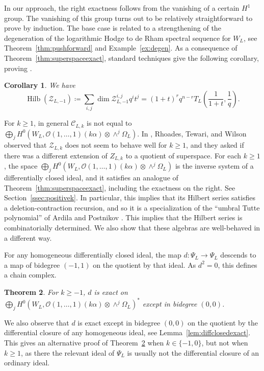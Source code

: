 \documentclass{amsart}
\newtheorem{theorem}{Theorem}[section]
\newtheorem{corollary}[theorem]{Corollary}
\theoremstyle{definition}
\begin{document}
In our approach, the right exactness follows from the vanishing of a certain $H^1$ group. The vanishing of this group turns out to be relatively straightforward to prove by induction. The base case is related to a strengthening of the degeneration of the logarithmic Hodge to de Rham spectral sequence for $W_L$, see Theorem~\ref{thm:pushforward} and Example~\ref{ex:degen}. As a consequence of Theorem~\ref{thm:superspaceexact}, standard techniques give the following corollary, proving \cite[Conjecture 6.1]{Superspace}. 

\begin{corollary}\label{cor:hilbert}
We have
$$\operatorname{Hilb}(\mathcal{Z}_{L, -1}) \coloneqq \sum_{i, j} \dim \mathcal{Z}_{L, -1}^{i,j} q^it^j = (1 + t)^r q^{n-r} T_L( \frac{1}{1 + t}, \frac{1}{q}).$$
\end{corollary}

For $k \ge 1$, in general $\mathcal{C}_{L, k}$ is not equal to $\bigoplus_j H^0(W_L, \mathcal{O}(1, \dotsc, 1)(k\alpha) \otimes \wedge^j \Omega_L)$. In \cite[Section 6.2]{Superspace}, Rhoades, Tewari, and Wilson observed that $\mathcal{Z}_{L, k}$ does not seem to behave well for $k \ge 1$, and they asked if there was a different extension of $Z_{L, k}$ to a quotient of superspace. For each $k \ge 1$, the space $\bigoplus_j H^0(W_L, \mathcal{O}(1, \dotsc, 1)(k\alpha) \otimes \wedge^j \Omega_L)$ is the inverse system of a differentially closed ideal, and it satisfies an analogue of Theorem~\ref{thm:superspaceexact}, including the exactness on the right. See Section~\ref{ssec:positivek}. 
In particular, this implies that its Hilbert series satisfies a deletion-contraction recursion, and so it is a specialization of the ``umbral Tutte polynomial'' of Ardila and Postnikov \cite[Proposition 4.11]{ArdilaPostnikov}. This implies that the Hilbert series is combinatorially determined. 
We also show that these algebras are well-behaved in a different way. 

For any homogeneous differentially closed ideal, the map $d \colon \Psi_L \to \Psi_L$ descends to a map of bidegree $(-1, 1)$ on the quotient by that ideal. As $d^2 = 0$, this defines a chain complex.  

\begin{theorem}\label{thm:exact}
For $k \ge -1$, $d$ is exact on $\bigoplus_j H^0(W_L, \mathcal{O}(1, \dotsc, 1)(k\alpha) \otimes \wedge^j \Omega_L)^*$ except in bidegree $(0,0)$. 
\end{theorem}

We also observe that $d$ is exact except in bidegree $(0,0)$ on the quotient by the differential closure of any homogeneous ideal, see Lemma~\ref{lem:diffclosedexact}. This gives an alternative proof of Theorem~\ref{thm:exact} when $k \in \{-1,0\}$, but not when $k \ge 1$, as there the relevant ideal of $\Psi_L$ is usually not the differential closure of an ordinary ideal. 
\end{document}
